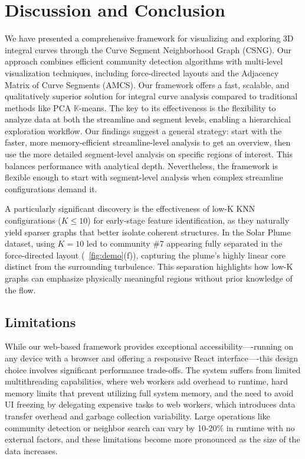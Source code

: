 
\section{Discussion and Conclusion}
\label{sec:discussion}

We have presented a comprehensive framework for visualizing and exploring 3D integral curves through the Curve Segment Neighborhood Graph (CSNG). Our approach combines efficient community detection algorithms with multi-level visualization techniques, including force-directed layouts and the Adjacency Matrix of Curve Segments (AMCS). Our framework offers a fast, scalable, and qualitatively superior solution for integral curve analysis compared to traditional methods like PCA $\mathbb{K}$-means. The key to its effectiveness is the flexibility to analyze data at both the streamline and segment levels, enabling a hierarchical exploration workflow. Our findings suggest a general strategy: start with the faster, more memory-efficient streamline-level analysis to get an overview, then use the more detailed segment-level analysis on specific regions of interest. This balances performance with analytical depth. Nevertheless, the framework is flexible enough to start with segment-level analysis when complex streamline configurations demand it.

A particularly significant discovery is the effectiveness of low-K KNN configurations ($K \leq 10$) for early-stage feature identification, as they naturally yield sparser graphs that better isolate coherent structures. In the Solar Plume dataset, using $K=10$ led to community \#7 appearing fully separated in the force-directed layout (~\autoref{fig:demo}(f)), capturing the plume’s highly linear core distinct from the surrounding turbulence. This separation highlights how low-K graphs can emphasize physically meaningful regions without prior knowledge of the flow.


\subsection{Limitations}

While our web-based framework provides exceptional accessibility—-running on any device with a browser and offering a responsive React interface—-this design choice involves significant performance trade-offs. The system suffers from limited multithreading capabilities, where web workers add overhead to runtime, hard memory limits that prevent utilizing full system memory, and the need to avoid UI freezing by delegating expensive tasks to web workers, which introduces data transfer overhead and garbage collection variability. Large operations like community detection or neighbor search can vary by 10-20\% in runtime with no external factors, and these limitations become more pronounced as the size of the data increases.

